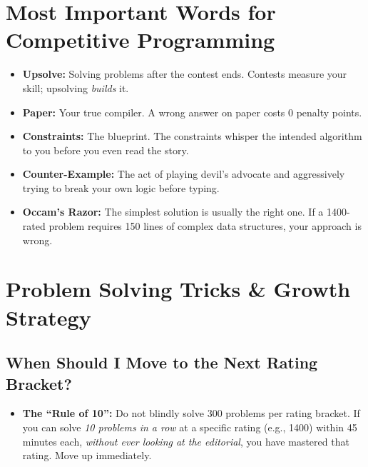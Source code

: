 \documentclass[12pt, a4paper]{article}
\begin{document}
\section{Most Important Words for Competitive Programming}

\begin{sidebarGray}
\begin{itemize}[leftmargin=1.5em, itemsep=6pt]

  \item \textbf{Upsolve:} Solving problems after the contest ends. Contests
        measure your skill; upsolving \emph{builds} it.

  \item \textbf{Paper:} Your true compiler. A wrong answer on paper costs
        0 penalty points.

  \item \textbf{Constraints:} The blueprint. The constraints whisper the
        intended algorithm to you before you even read the story.

  \item \textbf{Counter-Example:} The act of playing devil's advocate and
        aggressively trying to break your own logic before typing.

  \item \textbf{Occam's Razor:} The simplest solution is usually the right one.
        If a 1400-rated problem requires 150 lines of complex data structures,
        your approach is wrong.

\end{itemize}
\end{sidebarGray}

\section{Problem Solving Tricks \& Growth Strategy}

\subsection*{When Should I Move to the Next Rating Bracket?}

\begin{itemize}[leftmargin=2em, itemsep=4pt]

  \item \textbf{The ``Rule of 10'':} Do not blindly solve 300 problems per
        rating bracket. If you can solve \emph{10 problems in a row} at a
        specific rating (e.g., 1400) within 45 minutes each, \emph{without
        ever looking at the editorial}, you have mastered that rating.
        Move up immediately.

\end{itemize}
\end{document}

